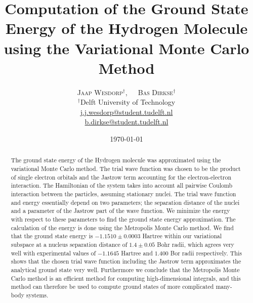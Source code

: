 \documentclass[twoside]{article}
\title{\vspace{-15mm}\fontsize{18pt}{10pt}\selectfont\textbf{Computation of the Ground State Energy of the Hydrogen Molecule using the Variational Monte Carlo Method}} %
\author{
	\large
	\textsc{Jaap Wesdorp}$^\dagger$, $\hspace{10pt}$ \textsc{Bas Dirkse}$^\dagger$ \\ %
	\normalsize $^\dagger$Delft University of Technology \\ %
	\normalsize \href{mailto:j.j.wesdorp@student.tudelft.nl}{j.j.wesdorp@student.tudelft.nl} \\
	\normalsize \href{mailto:b.dirkse@student.tudelft.nl}{b.dirkse@student.tudelft.nl} 
}
\date{\today\vspace{-8mm}}
\begin{document}


\maketitle %
\thispagestyle{firststyle} %


\begin{abstract}
\noindent  
The ground state energy of the Hydrogen molecule was approximated using the variational Monte Carlo method. The trial wave function was chosen to be the product of single electron orbitals and the Jastrow term accounting for the electron-electron interaction. The Hamiltonian of the system takes into account all pairwise Coulomb interaction between the particles, assuming stationary nuclei. The trial wave function and energy essentially depend on two parameters; the separation distance of the nuclei and a parameter of the Jastrow part of the wave function. We minimize the energy with respect to these parameters to find the ground state energy approximation. The calculation of the energy is done using the Metropolis Monte Carlo method. We find that the ground state energy is $-1.1510 \pm 0.0003$ Hartree within our variational subspace at a nucleus separation distance of $1.4 \pm 0.05$ Bohr radii, which agrees very well with experimental values of $-1.1645$ Hartree and $1.400$ Bor radii respectively. This shows that the chosen trial wave function including the Jastrow term approximates the analytical ground state very well. Furthermore we conclude that the Metropolis Monte Carlo method is an efficient method for computing high-dimensional integrals, and this method can therefore be used to compute ground states of more complicated many-body systems.

	
\end{abstract}

\end{document}
